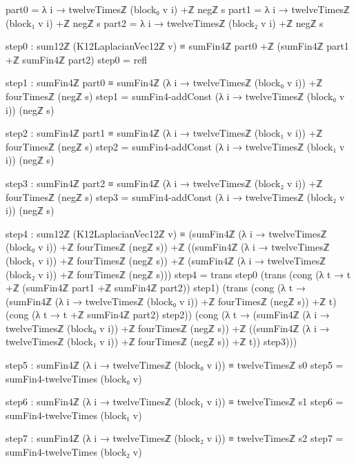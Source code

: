 \documentclass[11pt,a4paper]{book}
\begin{document}
\begin{code}
      part0 = λ i → twelveTimesℤ (block₀ v i) +ℤ negℤ s
      part1 = λ i → twelveTimesℤ (block₁ v i) +ℤ negℤ s
      part2 = λ i → twelveTimesℤ (block₂ v i) +ℤ negℤ s

      step0 :
        sum12ℤ (K12LaplacianVec12ℤ v) ≡ sumFin4ℤ part0 +ℤ (sumFin4ℤ part1 +ℤ sumFin4ℤ part2)
      step0 = refl

      step1 :
        sumFin4ℤ part0 ≡ sumFin4ℤ (λ i → twelveTimesℤ (block₀ v i)) +ℤ fourTimesℤ (negℤ s)
      step1 = sumFin4-addConst (λ i → twelveTimesℤ (block₀ v i)) (negℤ s)

      step2 :
        sumFin4ℤ part1 ≡ sumFin4ℤ (λ i → twelveTimesℤ (block₁ v i)) +ℤ fourTimesℤ (negℤ s)
      step2 = sumFin4-addConst (λ i → twelveTimesℤ (block₁ v i)) (negℤ s)

      step3 :
        sumFin4ℤ part2 ≡ sumFin4ℤ (λ i → twelveTimesℤ (block₂ v i)) +ℤ fourTimesℤ (negℤ s)
      step3 = sumFin4-addConst (λ i → twelveTimesℤ (block₂ v i)) (negℤ s)

      step4 :
        sum12ℤ (K12LaplacianVec12ℤ v) ≡
          (sumFin4ℤ (λ i → twelveTimesℤ (block₀ v i)) +ℤ fourTimesℤ (negℤ s)) +ℤ
          ((sumFin4ℤ (λ i → twelveTimesℤ (block₁ v i)) +ℤ fourTimesℤ (negℤ s)) +ℤ
           (sumFin4ℤ (λ i → twelveTimesℤ (block₂ v i)) +ℤ fourTimesℤ (negℤ s)))
      step4 =
        trans
          step0
          (trans
            (cong (λ t → t +ℤ (sumFin4ℤ part1 +ℤ sumFin4ℤ part2)) step1)
            (trans
              (cong
                (λ t → (sumFin4ℤ (λ i → twelveTimesℤ (block₀ v i)) +ℤ fourTimesℤ (negℤ s)) +ℤ t)
                (cong (λ t → t +ℤ sumFin4ℤ part2) step2))
              (cong
                (λ t →
                  (sumFin4ℤ (λ i → twelveTimesℤ (block₀ v i)) +ℤ fourTimesℤ (negℤ s)) +ℤ
                  ((sumFin4ℤ (λ i → twelveTimesℤ (block₁ v i)) +ℤ fourTimesℤ (negℤ s)) +ℤ t))
                step3)))

      step5 :
        sumFin4ℤ (λ i → twelveTimesℤ (block₀ v i)) ≡ twelveTimesℤ s0
      step5 = sumFin4-twelveTimes (block₀ v)

      step6 :
        sumFin4ℤ (λ i → twelveTimesℤ (block₁ v i)) ≡ twelveTimesℤ s1
      step6 = sumFin4-twelveTimes (block₁ v)

      step7 :
        sumFin4ℤ (λ i → twelveTimesℤ (block₂ v i)) ≡ twelveTimesℤ s2
      step7 = sumFin4-twelveTimes (block₂ v)


\end{code}
\end{document}
